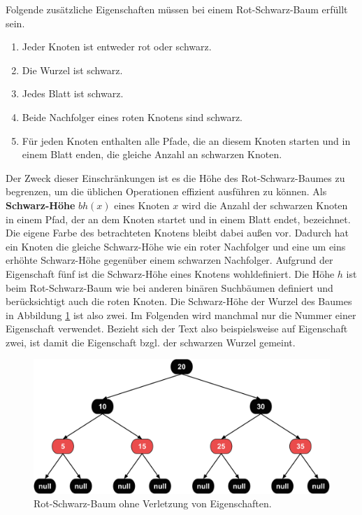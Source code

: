 \documentclass[a4paper,12pt]{article}
\begin{document}
\noindent Folgende zusätzliche Eigenschaften müssen bei einem Rot-Schwarz-Baum erfüllt sein. 

\begin{enumerate}
	\item Jeder Knoten ist entweder rot oder schwarz.
	\item Die Wurzel ist schwarz.
	\item Jedes Blatt ist schwarz.
	\item Beide Nachfolger eines roten Knotens sind schwarz.
	\item Für jeden Knoten enthalten alle Pfade, die an diesem Knoten starten und in einem Blatt enden, die gleiche Anzahl an schwarzen Knoten. 
\end{enumerate}  

\noindent  Der Zweck dieser Einschränkungen ist es die Höhe des Rot-Schwarz-Baumes zu begrenzen, um die üblichen Operationen effizient ausführen zu können. Als \textbf{Schwarz-Höhe} $\mathit{bh(x)}$ eines Knoten $x$ wird die Anzahl der schwarzen Knoten in einem Pfad, der an dem Knoten startet und in einem Blatt endet, bezeichnet. Die eigene Farbe des betrachteten Knotens bleibt dabei außen vor. Dadurch hat ein Knoten die gleiche Schwarz-Höhe wie ein roter Nachfolger und eine um eins erhöhte Schwarz-Höhe gegenüber einem schwarzen Nachfolger. Aufgrund der Eigenschaft fünf ist die Schwarz-Höhe eines Knotens wohldefiniert. Die Höhe $h$ ist beim Rot-Schwarz-Baum wie bei anderen binären Suchbäumen definiert und berücksichtigt auch die roten Knoten. Die Schwarz-Höhe der Wurzel des Baumes in Abbildung \ref{fig:IOBaum} ist also zwei. Im Folgenden wird manchmal nur die Nummer einer Eigenschaft verwendet. Bezieht sich der Text also beispielsweise auf Eigenschaft zwei, ist damit die Eigenschaft bzgl. der schwarzen Wurzel gemeint.
\\
\begin{figure}[h]
	\centering
	\includegraphics[width= 1\textwidth]{"Medien/RotSchwarzBaum/IOBaum"}
	\caption{Rot-Schwarz-Baum ohne Verletzung von Eigenschaften. }
	\label{fig:IOBaum}
\end{figure}
\end{document}
